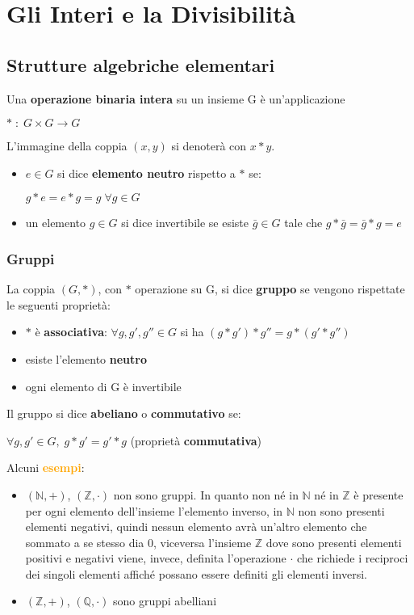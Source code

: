 \chapter{Gli Interi e la Divisibilità}
\section{Strutture algebriche elementari}
Una \textbf{operazione binaria intera} su un insieme G è un'applicazione 

{\centering
    $\ast \; : \; G \times G \rightarrow G$
\par}
L'immagine della coppia $(x,y)$ si denoterà con $x \ast y$. 
\begin{itemize}[nosep]
    \item $e \in G$ si dice \textbf{elemento neutro} rispetto a $\ast$ se:
    \begin{center}
        $g \ast e = e \ast g = g \; \forall g \in G$
    \end{center}
    \item un elemento $g \in G$ si dice invertibile se esiste $\bar{g} \in G$ tale che $g * \bar{g} = \bar{g} * g = e$
\end{itemize}

\subsection{Gruppi}
La coppia $(G, \ast)$, con $\ast$ operazione su G, si dice \textbf{gruppo} se vengono rispettate le seguenti proprietà:
\begin{itemize}[nosep]
    \item $\ast$ è \textbf{associativa}: $\forall g, g', g'' \in G$ si ha $(g \ast g') \ast g'' = g \ast (g' \ast g'')$
    \item esiste l'elemento \textbf{neutro}
    \item ogni elemento di G è invertibile
\end{itemize}
Il gruppo si dice \textbf{abeliano} o \textbf{commutativo} se: 
\begin{center}
    $\forall g, g' \in G, \; g \ast g' = g' \ast g$ (proprietà \textbf{commutativa})
\end{center}
Alcuni \textcolor{orange}{\textbf{esempi}}:
\begin{itemize}[nosep]
    \item $(\mathbb{N}, +)$, $(\mathbb{Z}, \cdot)$ non sono gruppi. In quanto non né in $\mathbb{N}$ né in $\mathbb{Z}$ è presente per ogni elemento dell'insieme l'elemento inverso, in $\mathbb{N}$ non sono presenti elementi negativi, quindi nessun elemento avrà un'altro elemento che sommato a se stesso dia 0, viceversa l'insieme $\mathbb{Z}$ dove sono presenti elementi positivi e negativi viene, invece, definita l'operazione $\cdot$ che richiede i reciproci dei singoli elementi affiché possano essere definiti gli elementi inversi.
    \item $(\mathbb{Z}, +)$, $(\mathbb{Q}, \cdot)$ sono gruppi abelliani
\end{itemize}

